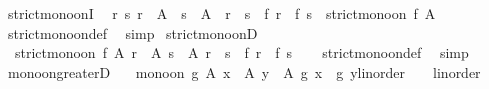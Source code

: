 \begin{isabellebody}
\isanewline
{}\isamarkupfalse%
\ strict{\isacharunderscore}{\kern0pt}mono{\isacharunderscore}{\kern0pt}onI{\isacharcolon}{\kern0pt}\isanewline
\ \ {\isachardoublequoteopen}{\isacharparenleft}{\kern0pt}{\isasymAnd}r\ s{\isachardot}{\kern0pt}\ r\ {\isasymin}\ A\ {\isasymLongrightarrow}\ s\ {\isasymin}\ A\ {\isasymLongrightarrow}\ r\ {\isacharless}{\kern0pt}\ s\ {\isasymLongrightarrow}\ f\ r\ {\isacharless}{\kern0pt}\ f\ s{\isacharparenright}{\kern0pt}\ {\isasymLongrightarrow}\ strict{\isacharunderscore}{\kern0pt}mono{\isacharunderscore}{\kern0pt}on\ f\ A{\isachardoublequoteclose}\isanewline
%
\isadelimproof
\ \ %
\endisadelimproof
%
\isatagproof
{}\isamarkupfalse%
\ strict{\isacharunderscore}{\kern0pt}mono{\isacharunderscore}{\kern0pt}on{\isacharunderscore}{\kern0pt}def\ \isamarkupfalse%
\ simp%
\endisatagproof
{\isafoldproof}%
%
\isadelimproof
\isanewline
%
\endisadelimproof
\isanewline
{}\isamarkupfalse%
\ strict{\isacharunderscore}{\kern0pt}mono{\isacharunderscore}{\kern0pt}onD{\isacharcolon}{\kern0pt}\isanewline
\ \ {\isachardoublequoteopen}{\isasymlbrakk}strict{\isacharunderscore}{\kern0pt}mono{\isacharunderscore}{\kern0pt}on\ f\ A{\isacharsemicolon}{\kern0pt}\ r\ {\isasymin}\ A{\isacharsemicolon}{\kern0pt}\ s\ {\isasymin}\ A{\isacharsemicolon}{\kern0pt}\ r\ {\isacharless}{\kern0pt}\ s{\isasymrbrakk}\ {\isasymLongrightarrow}\ f\ r\ {\isacharless}{\kern0pt}\ f\ s{\isachardoublequoteclose}\isanewline
%
\isadelimproof
\ \ %
\endisadelimproof
%
\isatagproof
{}\isamarkupfalse%
\ strict{\isacharunderscore}{\kern0pt}mono{\isacharunderscore}{\kern0pt}on{\isacharunderscore}{\kern0pt}def\ \isamarkupfalse%
\ simp%
\endisatagproof
{\isafoldproof}%
%
\isadelimproof
\isanewline
%
\endisadelimproof
\isanewline
{}\isamarkupfalse%
\ mono{\isacharunderscore}{\kern0pt}on{\isacharunderscore}{\kern0pt}greaterD{\isacharcolon}{\kern0pt}\isanewline
\ \ \ {\isachardoublequoteopen}mono{\isacharunderscore}{\kern0pt}on\ g\ A{\isachardoublequoteclose}\ {\isachardoublequoteopen}x\ {\isasymin}\ A{\isachardoublequoteclose}\ {\isachardoublequoteopen}y\ {\isasymin}\ A{\isachardoublequoteclose}\ {\isachardoublequoteopen}g\ x\ {\isachargreater}{\kern0pt}\ {\isacharparenleft}{\kern0pt}g\ {\isacharparenleft}{\kern0pt}y{\isacharcolon}{\kern0pt}{\isacharcolon}{\kern0pt}{\isacharunderscore}{\kern0pt}{\isacharcolon}{\kern0pt}{\isacharcolon}{\kern0pt}linorder{\isacharparenright}{\kern0pt}\ {\isacharcolon}{\kern0pt}{\isacharcolon}{\kern0pt}\ {\isacharunderscore}{\kern0pt}\ {\isacharcolon}{\kern0pt}{\isacharcolon}{\kern0pt}\ linorder{\isacharparenright}{\kern0pt}{\isachardoublequoteclose}\isanewline

\end{isabellebody}
